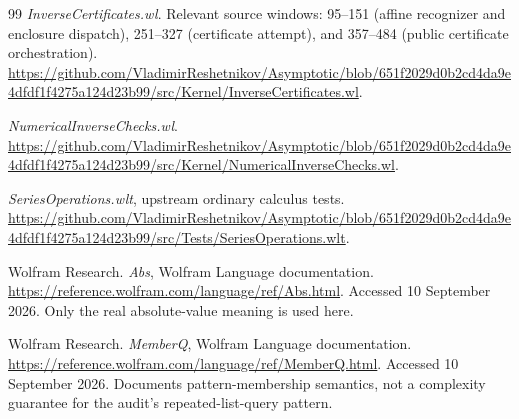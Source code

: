 \documentclass[11pt,a4paper]{article}
\begin{document}
\begin{thebibliography}{99}
 \emph{InverseCertificates.wl}.
Relevant source windows: 95--151 (affine recognizer and enclosure dispatch),
251--327 (certificate attempt), and 357--484 (public certificate orchestration).
\url{https://github.com/VladimirReshetnikov/Asymptotic/blob/651f2029d0b2cd4da9e4dfdf1f4275a124d23b99/src/Kernel/InverseCertificates.wl}.

 \emph{NumericalInverseChecks.wl}.
\url{https://github.com/VladimirReshetnikov/Asymptotic/blob/651f2029d0b2cd4da9e4dfdf1f4275a124d23b99/src/Kernel/NumericalInverseChecks.wl}.

 \emph{SeriesOperations.wlt}, upstream ordinary calculus tests.
\url{https://github.com/VladimirReshetnikov/Asymptotic/blob/651f2029d0b2cd4da9e4dfdf1f4275a124d23b99/src/Tests/SeriesOperations.wlt}.

 Wolfram Research. \emph{Abs}, Wolfram Language documentation.
\url{https://reference.wolfram.com/language/ref/Abs.html}.
Accessed 10 September 2026. Only the real absolute-value meaning is used here.

 Wolfram Research. \emph{MemberQ}, Wolfram Language documentation.
\url{https://reference.wolfram.com/language/ref/MemberQ.html}.
Accessed 10 September 2026. Documents pattern-membership semantics, not a
complexity guarantee for the audit's repeated-list-query pattern.
\end{thebibliography}
\end{document}
